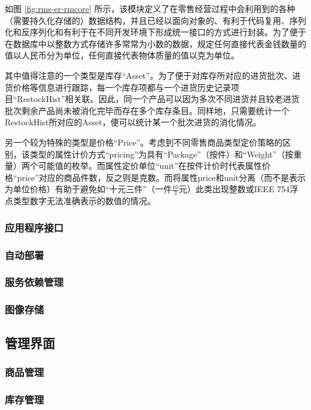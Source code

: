 如图 \ref{fig:rms-er-rmcore} 所示，该模块定义了在零售经营过程中会利用到的各种（需要持久化存储的）数据结构，并且已经以面向对象的、有利于代码复用、序列化和反序列化和有利于在不同开发环境下形成统一接口的方式进行封装。为了便于在数据库中以整数方式存储许多常常为小数的数据，规定任何直接代表金钱数量的值以人民币分为单位，任何直接代表物体质量的值以克为单位。

其中值得注意的一个类型是库存“Asset”。为了便于对库存所对应的进货批次、进货价格等信息进行跟踪，每一个库存项都与一个进货历史记录项目“RestockHist”相关联。因此，同一个产品可以因为多次不同进货并且较老进货批次剩余产品尚未被消化完毕而存在多个库存条目。同样地，只需要统计一个RestockHist所对应的Asset，便可以统计某一个批次进货的消化情况。

另一个较为特殊的类型是价格“Price”。考虑到不同零售商品类型定价策略的区别，该类型的属性计价方式“pricing”为具有“Package”（按件）和“Weight”（按重量）两个可能值的枚举。而属性定价单位“unit”在按件计价时代表属性价格“price”对应的商品件数，反之则是克数。而将属性price和unit分离（而不是表示为单位价格）有助于避免如“十元三件”（一件$\frac{10}{3}$元）此类出现整数或IEEE 754浮点类型数字无法准确表示的数值的情况。

\subsubsection{应用程序接口}

\subsubsection{自动部署}

\subsubsection{服务依赖管理}

\subsubsection{图像存储}

\subsection{管理界面}

\subsubsection{商品管理}

\subsubsection{库存管理}

